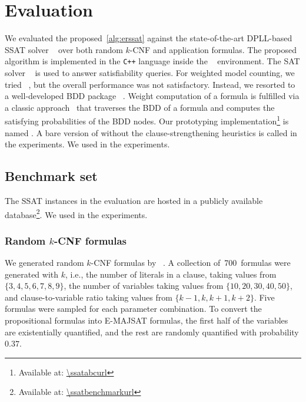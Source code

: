 \renewcommand{\nrandom}{\num{700}}
\renewcommand{\napplication}{\num{212}}
\newcommand{\ntoilet}{\num{77}}
\newcommand{\nmaxcount}{\num{26}}
\newcommand{\nsandcastle}{\num{25}}
\newcommand{\nconformant}{\num{24}}
\newcommand{\nmpec}{\num{60}}

\section{Evaluation}
\label{sect:erssat-evaluation}

We evaluated the proposed~\cref{alg:erssat} against
the state-of-the-art DPLL-based SSAT solver \dcssat~\cite{Majercik2005}
over both random $k$-CNF and application formulas.
The proposed algorithm is implemented in the \texttt{C++} language inside the \abc~\cite{ABC} environment.
The SAT solver ~\cite{Een2003Solver} is used to answer satisfiability queries.
For weighted model counting,
we tried \cachet~\cite{Sang2004,Sang2005ModelCounting},
but the overall performance was not satisfactory.
Instead, we resorted to a well-developed BDD package \cudd~\cite{CUDD}.
Weight computation of a formula is fulfilled via a classic approach~\cite{Darwiche2002KnowledgeCompilation} that traverses the BDD of a formula and computes the satisfying probabilities of the BDD nodes.
Our prototyping implementation\footnote{Available at: \url{\ssatabcurl}} is named \erssat.
A bare version of \erssat without the clause-strengthening heuristics is called \erssatb in the experiments.
We used \ssatABCRevision in the experiments.

\subsection{Benchmark set}
The SSAT instances in the evaluation are hosted
in a publicly available database\footnote{Available at: \url{\ssatbenchmarkurl}}.
We used \ssatBenchRevision in the experiments.

\subsubsection{Random $k$-CNF formulas}
We generated random $k$-CNF formulas by \cnfgen~\cite{Lauria2017CNFgen}.
A collection of~\nrandom~formulas were generated with $k$,
i.e., the number of literals in a clause,
taking values from $\{3,4,5,6,7,8,9\}$,
the number of variables taking values from $\{10,20,30,40,50\}$,
and clause-to-variable ratio taking values from $\{k-1,k,k+1,k+2\}$.
Five formulas were sampled for each parameter combination.
To convert the propositional formulas into E-MAJSAT formulas,
the first half of the variables are existentially quantified,
and the rest are randomly quantified with probability $0.37$.

